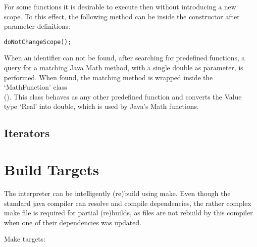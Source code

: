 For some functions it is desirable to execute then without introducing a new scope.
To this effect, the following method can be inside the constructor after parameter definitions:
\begin{lstlisting}[frame=none,numbers=none]
doNotChangeScope();
\end{lstlisting}


When an identifier can not be found, after searching for predefined functions, a query for a matching Java Math method, with a single double as parameter, is performed. When found, the matching method is wrapped inside the `MathFunction' class\\ (). This class behaves as any other predefined function and converts the \setlX{} Value type `Real' into double, which is used by Java's Math functions.
\subsection{Iterators}


\section{Build Targets}

The interpreter can be intelligently (re)build using make. Even though the standard java compiler can resolve and compile dependencies, the rather complex make file is required for partial (re)builds, as files are not rebuild by this compiler when one of their dependencies was updated.

Make targets:

